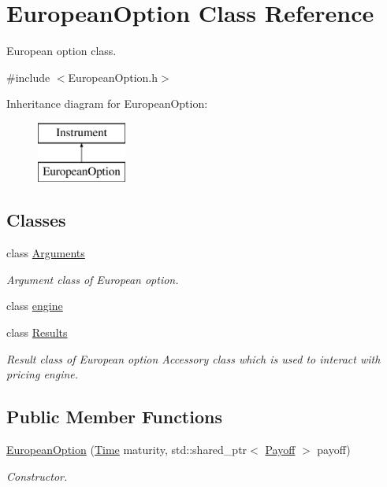 \hypertarget{class_european_option}{}\section{European\+Option Class Reference}
\label{class_european_option}


European option class.  




{\ttfamily \#include $<$European\+Option.\+h$>$}

Inheritance diagram for European\+Option\+:\begin{figure}[H]
\begin{center}
\leavevmode
\includegraphics[height=2.000000cm]{class_european_option}
\end{center}
\end{figure}
\subsection*{Classes}
\begin{DoxyCompactItemize}
\item 
class \hyperlink{class_european_option_1_1_arguments}{Arguments}
\begin{DoxyCompactList}\small\item\em Argument class of European option. \end{DoxyCompactList}\item 
class \hyperlink{class_european_option_1_1engine}{engine}
\item 
class \hyperlink{class_european_option_1_1_results}{Results}
\begin{DoxyCompactList}\small\item\em Result class of European option Accessory class which is used to interact with pricing engine. \end{DoxyCompactList}\end{DoxyCompactItemize}
\subsection*{Public Member Functions}
\begin{DoxyCompactItemize}
\item 
\hyperlink{class_european_option_a92132b61922cb628bc355d4d9f302513}{European\+Option} (\hyperlink{_name_def_8h_ac2d3e0ba793497bcca555c7c2cf64ff3}{Time} maturity, std\+::shared\+\_\+ptr$<$ \hyperlink{class_payoff}{Payoff} $>$ payoff)
\begin{DoxyCompactList}\small\item\em Constructor. \end{DoxyCompactList}\end{DoxyCompactItemize}

